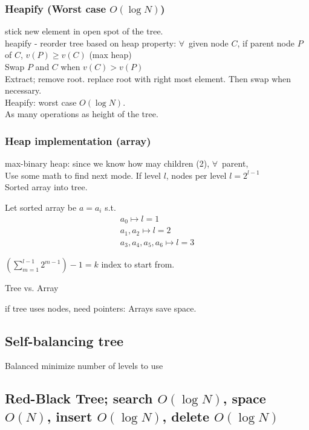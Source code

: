 \documentclass[10pt]{amsart}
\begin{document}
\subsubsection{Heapify (Worst case $O(\log{N})$)} 

stick new element in open spot of the tree. \\
heapify - reorder tree based on heap property: $\forall \, $ given node $C$, if parent node $P$ of $C$, $v(P) \geq v(C)$ (max heap) \\

Swap $P$ and $C$ when $v(C) > v(P)$ \\
Extract; remove root. replace root with right most element. Then swap when necessary. \\

Heapify: worst case $O(\log{N})$. \\
As many operations as height of the tree.

\subsubsection{Heap implementation (array)}

max-binary heap: since we know how may children (2), $\forall \, $ parent, \\
Use some math to find next mode. If level $l$, nodes per level $l= 2^{l-1}$ \\
Sorted array into tree.

Let sorted array be $a=a_i$ s.t. 
\[
\begin{gathered} 
a_0 \mapsto l = 1\\ 
a_1, a_2 \mapsto l = 2 \\ 
a_3, a_4, a_5, a_6 \mapsto l = 3 
\end{gathered} 
\]

$\left(\sum_{m=1}^{l-1} 2^{m-1} \right) - 1 = k$ index to start from. 

Tree vs. Array

if tree uses nodes, need pointers: Arrays save space. 

\subsection{Self-balancing tree}

Balanced minimize number of levels to use

\subsection{Red-Black Tree; search $O(\log{N})$, space $O(N)$, insert $O(\log{N})$, delete $O(\log{N})$ }
\end{document}
